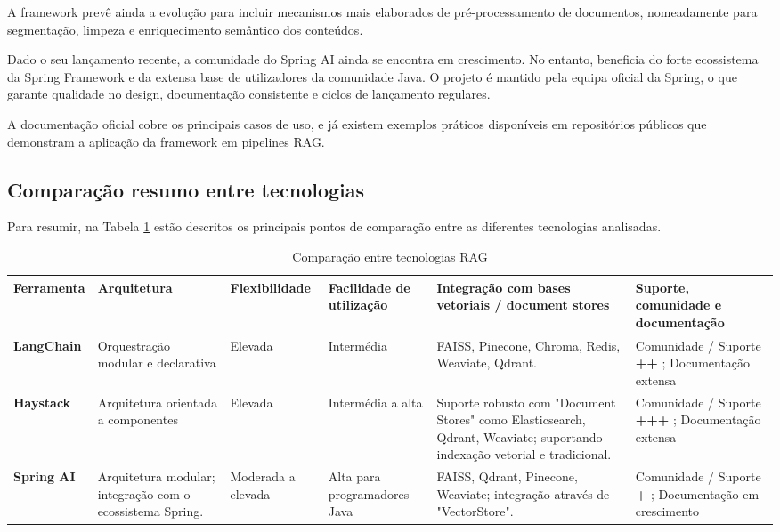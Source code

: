 A framework prevê ainda a evolução para incluir mecanismos mais elaborados de pré-processamento de documentos, nomeadamente para segmentação, limpeza e enriquecimento semântico dos conteúdos.


Dado o seu lançamento recente, a comunidade do Spring AI ainda se encontra em crescimento. No entanto, beneficia do forte ecossistema da Spring Framework e da extensa base de utilizadores da comunidade Java. O projeto é mantido pela equipa oficial da Spring, o que garante qualidade no design, documentação consistente e ciclos de lançamento regulares.

A documentação oficial cobre os principais casos de uso, e já existem exemplos práticos disponíveis em repositórios públicos que demonstram a aplicação da framework em pipelines RAG.


\subsection{Comparação resumo entre tecnologias}


Para resumir, na Tabela \ref{tab:tec-comp} estão descritos os principais pontos de comparação entre as diferentes tecnologias analisadas. 

\begin{table}[H]
        \centering
        \caption{Comparação entre tecnologias RAG}
        \label{tab:tec-comp}
        \renewcommand{\arraystretch}{1.2}
        \begin{tabularx}{\textwidth}{|X|X|X|X|X|X|}
        \hline
        \textbf{Ferramenta} & \textbf{Arquitetura} & \textbf{Flexibilidade} & \textbf{Facilidade de utilização} & \textbf{Integração com bases vetoriais / document stores} & \textbf{Suporte, comunidade e documentação} \\
        \hline
        \textbf{LangChain} & Orquestração modular e declarativa & Elevada & Intermédia &  FAISS, Pinecone, Chroma, Redis, Weaviate, Qdrant. & Comunidade / Suporte \textbf{++} ; Documentação extensa \\
        \hline
        \textbf{Haystack} & Arquitetura orientada a componentes & Elevada & Intermédia a alta & Suporte robusto com "Document Stores" como Elasticsearch, Qdrant, Weaviate; suportando indexação vetorial e tradicional. & Comunidade / Suporte \textbf{+++} ; Documentação extensa \\
        \hline
        \textbf{Spring AI} & Arquitetura modular; integração com o ecossistema Spring. & Moderada a elevada & Alta para programadores Java & FAISS, Qdrant, Pinecone, Weaviate; integração através de "VectorStore". & Comunidade / Suporte \textbf{+} ; Documentação em crescimento  \\
        \hline
        \end{tabularx}
    \end{table}

